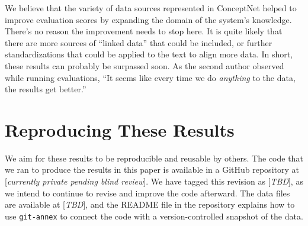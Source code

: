 \documentclass[11pt]{article}
\begin{document}
We believe that the variety of data sources represented in ConceptNet helped to
improve evaluation scores by expanding the domain of the system's knowledge.
There's no reason the improvement needs to stop here. It is quite likely that
there are more sources of ``linked data'' that could be included, or further
standardizations that could be applied to the text to align more data. In
short, these results can probably be surpassed soon. As the second author
observed while running evaluations, ``It seems like every time we do {\em
anything} to the data, the results get better.''

\section{Reproducing These Results}

We aim for these results to be reproducible and reusable by others. The code
that we ran to produce the results in this paper is available in a GitHub
repository at [{\em currently private pending blind review}]. We have tagged
this revision as [{\em TBD}], as we intend to continue to revise and improve the
code afterward. The data files are available at [{\em TBD}], and the README file
in the repository explains how to use {\tt git-annex} to connect the code
with a version-controlled snapshot of the data.

\begin{CJK*}{UTF8}{min}

\end{CJK*}
\end{document}
